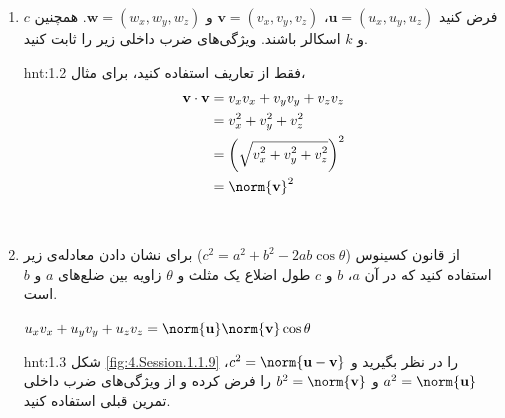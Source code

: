{\begin{spacing}{1.5}
\begin{enumerate}[label=\textbf{\arabic*}.]
            \item {فرض کنید $\textbf{u}=(u_{x},u_{y},u_{z})$، $\textbf{v}=(v_{x},v_{y},v_{z})$ و $\textbf{w}=(w_{x},w_{y},w_{z})$. همچنین $c$ و $k$ اسکالر باشند. ویژگی‌های ضرب داخلی زیر را ثابت کنید.}
            \begin{flushleft}
            \end{flushleft}
            \begin{hint}{hnt:1.2}
                \Large
                فقط از تعاریف استفاده کنید، برای مثال،
                \begin{equation*}
                    \centering
                    \begin{split}
                        \textbf{v}\cdot\textbf{v}&=v_{x}v_{x}+v_{y}v_{y}+v_{z}v_{z} \\
                        &=v_{x}^2+v_{y}^2+v_{z}^2 \\
                        &=\left( \sqrt{\displaystyle v_{x}^2+v_{y}^2+v_{z}^2} \right)^2 \\
                        &=\norm{\textbf{v}}^2
                    \end{split}
                \end{equation*}
            \end{hint}
            \\
            \item \label{question:1.10} {از قانون کسینوس ($c^2=a^2+b^2-2ab\cos\theta$) برای نشان دادن معادله‌ی زیر استفاده کنید که در آن $a$، $b$ و $c$ طول اضلاع یک مثلث و $\theta$ زاویه بین ضلع‌های $a$ و $b$ است.}
            \begin{center}
                $u_{x}v_{x}+u_{y}v_{y}+u_{z}v_{z}=\norm{\textbf{u}}\norm{\textbf{v}}\cos\theta$
            \end{center}
            \begin{hint}{hnt:1.3}
                \Large
                شکل \ref{fig:4.Session.1.1.9} را در نظر بگیرید و $c^2=\norm{\textbf{u}-\textbf{v}}$، $a^2=\norm{\textbf{u}}$ و $b^2=\norm{\textbf{v}}$ را فرض کرده و از ویژگی‌های ضرب داخلی تمرین قبلی استفاده کنید.

\end{hint}
\end{enumerate}
\end{spacing}}
